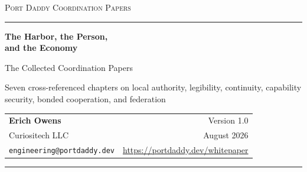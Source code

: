 
\hypersetup{pageanchor=false}
\begin{titlepage}
\pagecolor{hhpaper}\color{hhink}
\vspace*{1.2cm}
{\Large\scshape Port Daddy Coordination Papers}\par
\par\vspace{0.4cm}\noindent\color{hhcobalt}\rule{\textwidth}{2.2pt}\color{hhink}\par
\vspace{1.3cm}
{\Huge\bfseries The Harbor, the Person,\\[0.15cm]and the Economy}\par
\vspace{0.5cm}
{\LARGE The Collected Coordination Papers}\par
\vspace{0.9cm}
{\large Seven cross-referenced chapters on local authority, legibility,
continuity, capability security, bonded cooperation, and federation}\par
\vfill
\noindent\begin{tabularx}{\textwidth}{@{}Xr@{}}
\textbf{Erich Owens} & Version 1.0\\
Curiositech LLC & August 2026\\
\texttt{engineering@portdaddy.dev} & \url{https://portdaddy.dev/whitepaper}\\
\end{tabularx}
\par\vspace{0.5cm}\noindent\color{hhcobalt}\rule{\textwidth}{2.2pt}\par
\end{titlepage}
\nopagecolor\color{hhink}

\begin{abstract}\noindent
Autonomous coding agents are useful alone and institutionally fragile together.
This volume develops one continuous answer across seven independently readable
papers: a single local writer decides what is true; a legibility layer lets the
operator see and revoke what the swarm is doing; continuity turns an ephemeral
spawn into an accountable participant; capability attenuation bounds what that
participant may do; commitments, evidence, and bonds price failures; and a
federation boundary states what two mutually sovereign harbors may safely owe one
another. The collection separates running mechanisms from partial integrations,
precise specifications, and research proposals. Its final appendices consolidate
that implementation ledger and turn every important open claim into a proof,
experiment, or engineering obligation.
\end{abstract}

